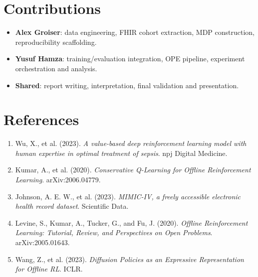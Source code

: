 \documentclass[10pt]{article}
\begin{document}
\section{Contributions}
\begin{itemize}[leftmargin=*]
  \item \textbf{Alex Groiser}: data engineering, FHIR cohort extraction, MDP construction, reproducibility scaffolding.
  \item \textbf{Yusuf Hamza}: training/evaluation integration, OPE pipeline, experiment orchestration and analysis.
  \item \textbf{Shared}: report writing, interpretation, final validation and presentation.
\end{itemize}

\section*{References}
\begin{enumerate}[leftmargin=*]
  \item Wu, X., et al. (2023). \emph{A value-based deep reinforcement learning model with human expertise in optimal treatment of sepsis}. npj Digital Medicine.
  \item Kumar, A., et al. (2020). \emph{Conservative Q-Learning for Offline Reinforcement Learning}. arXiv:2006.04779.
  \item Johnson, A. E. W., et al. (2023). \emph{MIMIC-IV, a freely accessible electronic health record dataset}. Scientific Data.
  \item Levine, S., Kumar, A., Tucker, G., and Fu, J. (2020). \emph{Offline Reinforcement Learning: Tutorial, Review, and Perspectives on Open Problems}. arXiv:2005.01643.
  \item Wang, Z., et al. (2023). \emph{Diffusion Policies as an Expressive Representation for Offline RL}. ICLR.
\end{enumerate}
\end{document}
